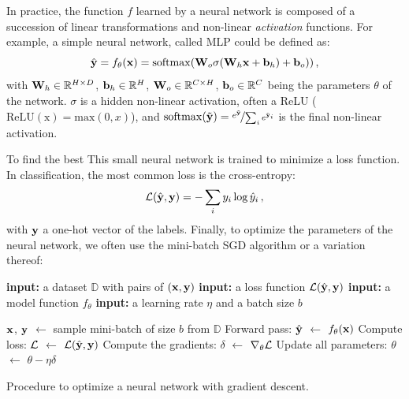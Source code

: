 In practice, the function $f$ learned by a neural network is composed of a succession of linear
transformations and non-linear \textit{activation} functions. For example, a simple neural network,
called \ac{MLP} could be defined as:
%
\begin{equation}
      \hat{\mathbf{y}} = f_\theta(\mathbf{x}) = \operatorname{softmax}(\mathbf{W}_o \sigma(\mathbf{W}_h \mathbf{x} + \mathbf{b}_h) + \mathbf{b}_o))\,,
      \label{eq:intro_mlp}
\end{equation}
%
\noindent with $\mathbf{W}_h \in \mathbb{R}^{H \times D}$, $\mathbf{b}_h \in \mathbb{R}^{H}$, $\mathbf{W}_o \in
      \mathbb{R}^{C \times H}$, $\mathbf{b}_o \in \mathbb{R}^{C}$ being the parameters $\theta$ of the
      network. $\sigma$ is a hidden non-linear activation, often a \ac{ReLU}
      ($\operatorname{ReLU(x)} = \text{max}(0, x)$), and $\operatorname{softmax}(\tilde{\mathbf{y}}) =
      \nicefrac{e^{\tilde{\mathbf{y}}}}{\sum_{i} e^{\tilde{\mathbf{y}}_i}}$ is the final non-linear activation.

To find the best
      This small neural network is trained to minimize a loss function. In classification, the most
      common loss is
the cross-entropy:
%
\begin{equation}
      \mathcal{L}(\hat{\mathbf{y}}, \mathbf{y}) = -\sum_i y_i \log \hat{y}_i\,,
      \label{eq:intro_ce}
\end{equation}
%
\noindent with $\mathbf{y}$ a one-hot vector of the labels. Finally, to optimize the parameters of the neural
network, we often use the mini-batch \ac{SGD} algorithm or a variation thereof:

\begin{algorithm}
      \begin{algorithmic}[1]
            \Statex \textbf{input:} a dataset $\mathbb{D}$ with pairs of $(\mathbf{x}, \mathbf{y})$
            \Statex \textbf{input:} a loss function $\mathcal{L}(\hat{\mathbf{y}}, \mathbf{y})$
            \Statex \textbf{input:} a model function $f_\theta$
            \Statex \textbf{input:} a learning rate $\eta$ and a batch size $b$
            \Statex

            \State $\mathbf{x}$, $\mathbf{y}$ $\gets$ sample mini-batch of size $b$ from $\mathbb{D}$
            \State Forward pass: $\hat{\mathbf{y}}$ $\gets$ $f_\theta(\mathbf{x})$
            \State Compute loss: $\mathcal{L}$ $\gets$ $\mathcal{L}(\hat{\mathbf{y}}, \mathbf{y})$
            \State Compute the gradients: $\delta$ $\gets$ $\nabla_\theta \mathcal{L}$
            \State Update all parameters: $\theta$ $\gets$ $\theta - \eta \delta$
            \EndWhile
      \end{algorithmic}
      \caption{Procedure to optimize a neural network with gradient descent.}
      \label{algo:intro_sgd}
\end{algorithm}

